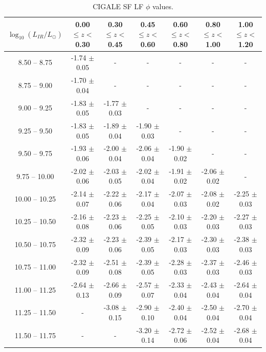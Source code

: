\begin{landscape}
    \begin{table}
    \begin{center}
    \caption{CIGALE SF LF $\phi$ values.}
    \label{Tab: CG SF LF}
    \begin{tabular}{@{}ccccccc@{}}
        \toprule
        $\log_{10}(L_{IR}/L_{\odot})$ & 0.00 $\leq z <$ 0.30 & 0.30 $\leq z <$ 0.45 & 0.45 $\leq z <$ 0.60 & 0.60 $\leq z <$ 0.80 & 0.80 $\leq z <$ 1.00 & 1.00 $\leq z <$ 1.20 \\
        \hline
         8.50 --  8.75 & -1.74 $\pm$ 0.05   & - & - & - & - & - \\
         8.75 --  9.00 & -1.70 $\pm$ 0.04   & - & - & - & - & - \\
         9.00 --  9.25 & -1.83 $\pm$ 0.05   & -1.77 $\pm$ 0.03  & - & - & - & - \\
         9.25 --  9.50 & -1.83 $\pm$ 0.05   & -1.89 $\pm$ 0.04  & -1.90 $\pm$ 0.03  & - & - & - \\
         9.50 --  9.75 & -1.93 $\pm$ 0.06   & -2.00 $\pm$ 0.04  & -2.06 $\pm$ 0.04  & -1.90 $\pm$ 0.02  & - & - \\
         9.75 -- 10.00 & -2.02 $\pm$ 0.06   & -2.03 $\pm$ 0.05  & -2.02 $\pm$ 0.04  & -1.91 $\pm$ 0.02  & -2.06 $\pm$ 0.02  & - \\
        10.00 -- 10.25 & -2.14 $\pm$ 0.07   & -2.22 $\pm$ 0.06  & -2.17 $\pm$ 0.04  & -2.07 $\pm$ 0.03  & -2.08 $\pm$ 0.02  & -2.25 $\pm$ 0.03 \\
        10.25 -- 10.50 & -2.16 $\pm$ 0.08   & -2.23 $\pm$ 0.06  & -2.25 $\pm$ 0.05  & -2.10 $\pm$ 0.03  & -2.20 $\pm$ 0.03  & -2.27 $\pm$ 0.03 \\
        10.50 -- 10.75 & -2.32 $\pm$ 0.09   & -2.23 $\pm$ 0.06  & -2.39 $\pm$ 0.05  & -2.17 $\pm$ 0.03  & -2.30 $\pm$ 0.03  & -2.38 $\pm$ 0.03 \\
        10.75 -- 11.00 & -2.32 $\pm$ 0.09   & -2.51 $\pm$ 0.08  & -2.39 $\pm$ 0.05  & -2.28 $\pm$ 0.03  & -2.37 $\pm$ 0.03  & -2.46 $\pm$ 0.03 \\
        11.00 -- 11.25 & -2.64 $\pm$ 0.13   & -2.66 $\pm$ 0.09  & -2.57 $\pm$ 0.07  & -2.33 $\pm$ 0.04  & -2.43 $\pm$ 0.04  & -2.64 $\pm$ 0.04 \\
        11.25 -- 11.50 & -                  & -3.08 $\pm$ 0.15  & -2.90 $\pm$ 0.10  & -2.40 $\pm$ 0.04  & -2.50 $\pm$ 0.04  & -2.70 $\pm$ 0.04 \\
        11.50 -- 11.75 & -                  & -                 & -3.20 $\pm$ 0.14  & -2.72 $\pm$ 0.06  & -2.52 $\pm$ 0.04  & -2.68 $\pm$ 0.04 \\

\end{tabular}
\end{center}
\end{table}
\end{landscape}
